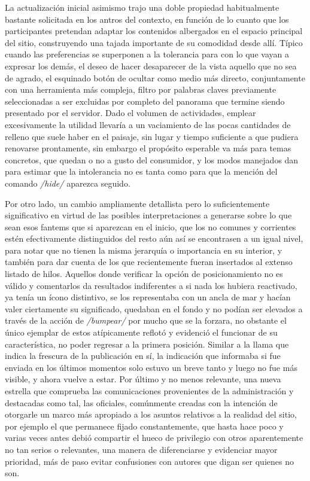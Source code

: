 \documentclass[
]{book}
\begin{document}
La actualización inicial asimismo trajo una doble propiedad habitualmente bastante solicitada en los antros del contexto, en función de lo cuanto que los participantes pretendan adaptar los contenidos albergados en el espacio principal del sitio, construyendo una tajada importante de su comodidad desde allí. Típico cuando las preferencias se superponen a la tolerancia para con lo que vayan a expresar los demás, el deseo de hacer desaparecer de la vista aquello que no sea de agrado, el esquinado botón de ocultar como medio más directo, conjuntamente con una herramienta más compleja, filtro por palabras claves previamente seleccionadas a ser excluidas por completo del panorama que termine siendo presentado por el servidor. Dado el volumen de actividades, emplear excesivamente la utilidad llevaría a un vaciamiento de las pocas cantidades de relleno que suele haber en el paisaje, sin lugar y tiempo suficiente a que pudiera renovarse prontamente, sin embargo el propósito esperable va más para temas concretos, que quedan o no a gusto del consumidor, y los modos manejados dan para estimar que la intolerancia no es tanta como para que la mención del comando \emph{/hide/} aparezca seguido.

Por otro lado, un cambio ampliamente detallista pero lo suficientemente significativo en virtud de las posibles interpretaciones a generarse sobre lo que sean esos fantems que si aparezcan en el inicio, que los no comunes y corrientes estén efectivamente distinguidos del resto aún así se encontrasen a un igual nivel, para notar que no tienen la misma jerarquía o importancia en su interior, y también para dar cuenta de los que recientemente fueran insertados al extenso listado de hilos. Aquellos donde verificar la opción de posicionamiento no es válido y comentarlos da resultados indiferentes a si nada los hubiera reactivado, ya tenía un ícono distintivo, se los representaba con un ancla de mar y hacían valer ciertamente su significado, quedaban en el fondo y no podían ser elevados a través de la acción de \emph{/bumpear/} por mucho que se la forzara, no obstante el único ejemplar de estos atípicamente reflotó y evidenció el funcionar de su característica, no poder regresar a la primera posición. Similar a la llama que indica la frescura de la publicación en sí, la indicación que informaba si fue enviada en los últimos momentos solo estuvo un breve tanto y luego no fue más visible, y ahora vuelve a estar. Por último y no menos relevante, una nueva estrella que comprueba las comunicaciones provenientes de la administración y destacadas como tal, las oficiales, comúnmente creadas con la intención de otorgarle un marco más apropiado a los asuntos relativos a la realidad del sitio, por ejemplo el que permanece fijado constantemente, que hasta hace poco y varias veces antes debió compartir el hueco de privilegio con otros aparentemente no tan serios o relevantes, una manera de diferenciarse y evidenciar mayor prioridad, más de paso evitar confusiones con autores que digan ser quienes no son.
\end{document}
